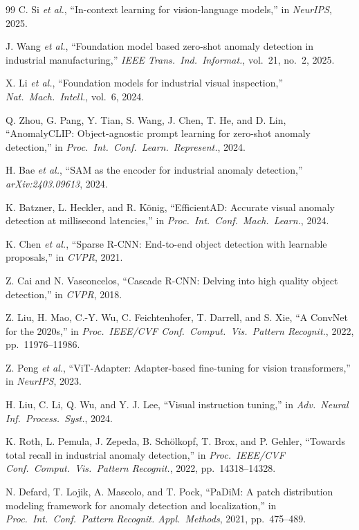 \documentclass[journal]{IEEEtran}
\begin{document}
\begin{thebibliography}{99}
 C. Si \textit{et al.}, ``In-context learning for vision-language models,'' in \textit{NeurIPS}, 2025.

 J. Wang \textit{et al.}, ``Foundation model based zero-shot anomaly detection in industrial manufacturing,'' \textit{IEEE Trans.\ Ind.\ Informat.}, vol.~21, no.~2, 2025.

 X. Li \textit{et al.}, ``Foundation models for industrial visual inspection,'' \textit{Nat.\ Mach.\ Intell.}, vol.~6, 2024.

 Q. Zhou, G. Pang, Y. Tian, S. Wang, J. Chen, T. He, and D. Lin, ``AnomalyCLIP: Object-agnostic prompt learning for zero-shot anomaly detection,'' in \textit{Proc.\ Int.\ Conf.\ Learn.\ Represent.}, 2024.

 H. Bae \textit{et al.}, ``SAM as the encoder for industrial anomaly detection,'' \textit{arXiv:2403.09613}, 2024.

 K. Batzner, L. Heckler, and R. K\"onig, ``EfficientAD: Accurate visual anomaly detection at millisecond latencies,'' in \textit{Proc.\ Int.\ Conf.\ Mach.\ Learn.}, 2024.

 K. Chen \textit{et al.}, ``Sparse R-CNN: End-to-end object detection with learnable proposals,'' in \textit{CVPR}, 2021.

 Z. Cai and N. Vasconcelos, ``Cascade R-CNN: Delving into high quality object detection,'' in \textit{CVPR}, 2018.

 Z. Liu, H. Mao, C.-Y. Wu, C. Feichtenhofer, T. Darrell, and S. Xie, ``A ConvNet for the 2020s,'' in \textit{Proc.\ IEEE/CVF Conf.\ Comput.\ Vis.\ Pattern Recognit.}, 2022, pp.~11976--11986.

 Z. Peng \textit{et al.}, ``ViT-Adapter: Adapter-based fine-tuning for vision transformers,'' in \textit{NeurIPS}, 2023.

 H. Liu, C. Li, Q. Wu, and Y. J. Lee, ``Visual instruction tuning,'' in \textit{Adv.\ Neural Inf.\ Process.\ Syst.}, 2024.

 K. Roth, L. Pemula, J. Zepeda, B. Sch\"olkopf, T. Brox, and P. Gehler, ``Towards total recall in industrial anomaly detection,'' in \textit{Proc.\ IEEE/CVF Conf.\ Comput.\ Vis.\ Pattern Recognit.}, 2022, pp.~14318--14328.

 N. Defard, T. Lojik, A. Mascolo, and T. Pock, ``PaDiM: A patch distribution modeling framework for anomaly detection and localization,'' in \textit{Proc.\ Int.\ Conf.\ Pattern Recognit. Appl.\ Methods}, 2021, pp.~475--489.


\end{thebibliography}
\end{document}
